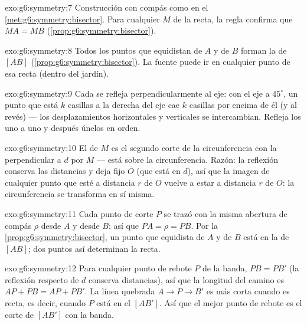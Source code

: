 \begin{solution}{exo:g6:symmetry:7}
Construcción con compás como en el \cref{met:g6:symmetry:bisector}. Para cualquier
$M$ de la recta, la regla confirma que $MA = MB$
(\cref{prop:g6:symmetry:bisector}).
\end{solution}

\begin{solution}{exo:g6:symmetry:8}
Todos los puntos que equidistan de $A$ y de $B$ forman la
 de $[AB]$ (\cref{prop:g6:symmetry:bisector}).
La fuente puede ir en cualquier punto de esa recta (dentro del jardín).
\end{solution}

\begin{solution}{exo:g6:symmetry:9}
Cada  se refleja perpendicularmente al eje: con el
eje a $45^\circ$, un punto que está $k$ casillas a la derecha del eje cae
$k$ casillas por encima de él (y al revés) --- los desplazamientos horizontales y
verticales se intercambian. Refleja los  uno a uno y después
únelos en orden.
\end{solution}

\begin{solution}{exo:g6:symmetry:10}
El  de $M$ es el segundo corte de la circunferencia con la
perpendicular a $d$ por $M$ --- está sobre la circunferencia. Razón:
la reflexión conserva las distancias y deja fijo $O$ (que está en $d$), así que
la imagen de cualquier punto que esté a distancia $r$ de $O$ vuelve a estar a distancia
$r$ de $O$: la circunferencia se transforma en sí misma.
\end{solution}

\begin{solution}{exo:g6:symmetry:11}
Cada punto de corte $P$ se trazó con la misma abertura de compás $\rho$
desde $A$ y desde $B$: así que $PA = \rho = PB$. Por la
\cref{prop:g6:symmetry:bisector}, un punto que equidista de $A$ y de $B$
está en la  de $[AB]$; dos puntos así determinan
la recta.
\end{solution}

\begin{solution}{exo:g6:symmetry:12}
Para cualquier punto de rebote $P$ de la banda, $PB = PB'$ (la reflexión respecto de
$d$ conserva distancias), así que la longitud del camino es
$AP + PB = AP + PB'$. La línea quebrada $A \to P \to B'$ es más corta
cuando es recta, es decir, cuando $P$ está en el  $[AB']$. Así que el
mejor punto de rebote es el corte de $[AB']$ con la banda.
\end{solution}

